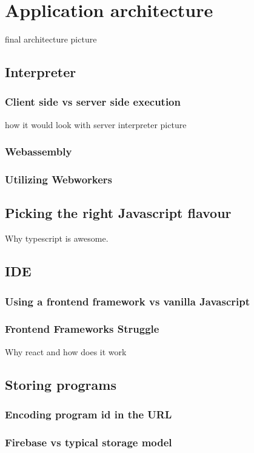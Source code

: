 \chapter{Application architecture}
final architecture picture

\section{Interpreter}

\subsection{Client side vs server side execution}
how it would look with server interpreter picture

\subsection{Webassembly}

\subsection{Utilizing Webworkers}

\section{Picking the right Javascript flavour}
Why typescript is awesome.

\section{IDE}

\subsection{Using a frontend framework vs vanilla Javascript}

\subsection{Frontend Frameworks Struggle}
Why react and how does it work

\section{Storing programs}

\subsection{Encoding program id in the URL}

\subsection{Firebase vs typical storage model}

